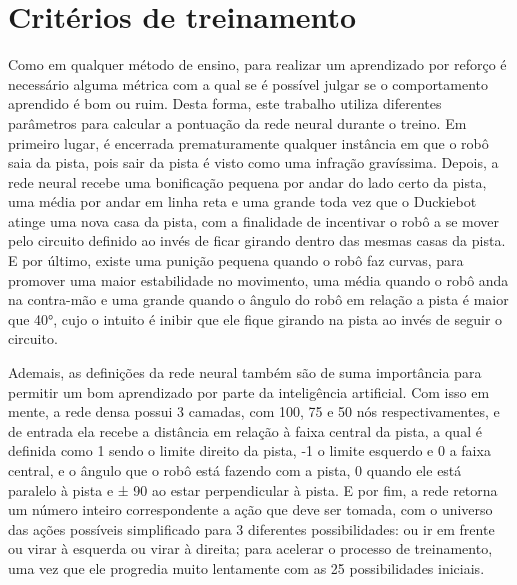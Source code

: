 \section{Critérios de treinamento}
\label{sec:criterios_de_treinamto}

Como em qualquer método de ensino, para realizar um aprendizado por reforço é necessário alguma métrica com a qual se é possível julgar se o comportamento aprendido é bom ou ruim. Desta forma, este trabalho utiliza diferentes parâmetros para calcular a pontuação da rede neural durante o treino. Em primeiro lugar, é encerrada prematuramente qualquer instância em que o robô saia da pista, pois sair da pista é visto como uma infração gravíssima. Depois, a rede neural recebe uma bonificação pequena por andar do lado certo da pista, uma média por andar em linha reta e uma grande toda vez que o Duckiebot atinge uma nova casa da pista, com a finalidade de incentivar o robô a se mover pelo circuito definido ao invés de ficar girando dentro das mesmas casas da pista. E por último, existe uma punição pequena quando o robô faz curvas, para promover uma maior estabilidade no movimento, uma média quando o robô anda na contra-mão e uma grande quando o ângulo do robô em relação a pista é maior que 40°, cujo o intuito é inibir que ele fique girando na pista ao invés de seguir o circuito.
	
Ademais, as definições da rede neural também são de suma importância para permitir um bom aprendizado por parte da inteligência artificial. Com isso em mente, a rede densa possui 3 camadas, com 100, 75 e 50 nós respectivamentes, e de entrada ela recebe a distância em relação à faixa central da pista, a qual é definida como 1 sendo o limite direito da pista, -1 o limite esquerdo e 0 a faixa central, e o ângulo que o robô está fazendo com a pista, 0 quando ele está paralelo à pista e ± 90 ao estar perpendicular à pista. E por fim, a rede retorna um número inteiro correspondente a ação que deve ser tomada, com o universo das ações possíveis simplificado para 3 diferentes possibilidades: ou ir em frente ou virar à esquerda ou virar à direita; para acelerar o processo de treinamento, uma vez que ele progredia muito lentamente com as 25 possibilidades iniciais.

